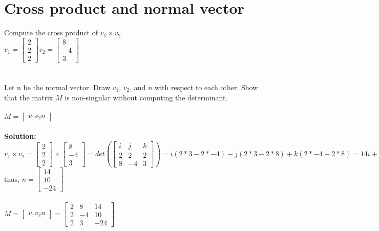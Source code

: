 \documentclass{article}
\begin{document}
\section{Cross product and normal vector}
Compute the cross product of $v_1 \times v_2$\\
$v_1=\begin{bmatrix}
2  \\
2   \\
2
\end{bmatrix}
v_2=\begin{bmatrix}
8  \\
-4   \\
3
\end{bmatrix}$ \\\\\\
Let n be the normal vector. Draw $v_1$, $v_2$, and $n$ with respect to each other. Show that the matrix $M$ is non-singular without computing the determinant.\\\\
$M=\begin{bmatrix}
v_1 v_2 n
\end{bmatrix}$\\\\
\textbf{Solution: }
$v_1 \times v_2 = \begin{bmatrix}
2  \\
2   \\
2
\end{bmatrix}
\times \begin{bmatrix}
8  \\
-4   \\
3
\end{bmatrix}= det(\begin{bmatrix}
i & j & k \\
2 & 2 & 2\\
8 & -4 & 3
\end{bmatrix})=i(2*3-2*-4)-j(2*3-2*8)+k(2*-4-2*8)=14i+10j-24k$ \\
thus, $n=\begin{bmatrix}
14\\
10\\
-24
\end{bmatrix}$\\\\
$M=\begin{bmatrix}
v_1 v_2 n
\end{bmatrix}=\begin{bmatrix}
2 & 8 & 14\\
2 & -4 & 10\\
2 & 3 & -24
\end{bmatrix}$\\
\end{document}
